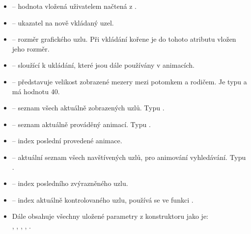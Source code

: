 \documentclass[
  biblatex=false,
  font=serif,
  glossaries=false,
  tables=false,
  theorems=false,
  index
]{kidiplom}
\begin{document}
\begin{itemize}
\item {} -- hodnota vložená uživatelem načtená z .
\item {} -- ukazatel na nově vkládaný uzel.
\item {} -- rozměr grafického uzlu. Při vkládání kořene je do tohoto atributu vložen jeho rozměr.
\item {} --  sloužící k ukládání, které jsou dále používány v animacích. 
\item {} -- představuje velikost zobrazené mezery mezi potomkem a rodičem. Je typu  a má hodnotu 40.
\item {} -- seznam všech aktuálně zobrazených uzlů. Typu .
\item {} -- seznam aktuálně prováděný animací. Typu .
\item {} -- index poslední provedené animace.
\item {} -- aktuální seznam všech navštívených uzlů, pro animování vyhledávání. Typu .
\item {} -- index posledního zvýrazněného uzlu.
\item {} -- index aktuálně kontrolovaného uzlu, používá se ve funkci .
\item Dále obsahuje všechny uložené parametry z konstruktoru jako je:\\, , , , .
\end{itemize}
\end{document}
